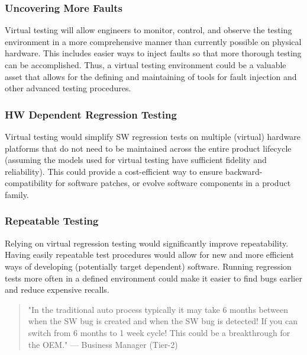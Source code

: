 \subsubsection{Uncovering More Faults}
Virtual testing will allow engineers to monitor, control, and observe the testing environment in a more comprehensive manner than currently possible on physical hardware. This includes easier ways to inject faults so that more thorough testing can be accomplished.
Thus, a virtual testing environment could be a valuable asset that allows for the defining and maintaining of tools for fault injection and other advanced testing procedures.

\subsubsection{HW Dependent Regression Testing}
Virtual testing would simplify SW regression tests on multiple (virtual) hardware platforms that do not need to be maintained across the entire product lifecycle (assuming the models used for virtual testing have sufficient fidelity and reliability). This could provide a cost-efficient way to ensure backward-compatibility for software patches, or evolve software components in a product family.

\subsubsection{Repeatable Testing}
Relying on virtual regression testing would significantly improve repeatability.
Having easily repeatable test procedures would allow for new and more efficient ways of developing (potentially target dependent) software. Running regression tests more often in a defined environment could make it easier to find bugs earlier and reduce expensive recalls.
\begin{quote}
"In the traditional auto process typically it may take 6 months between when the SW bug is created and when the SW bug is detected! If you can switch from 6 months to 1 week cycle! This could be a breakthrough for the OEM."
— Business Manager (Tier-2)
\end{quote}
